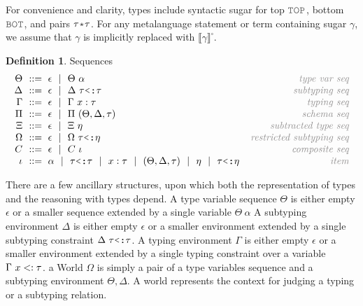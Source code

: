 \documentclass[acmsmall]{acmart}
\theoremstyle{definition}
\newtheorem{definition}{Definition}[section]
\begin{document}
\noindent
For convenience and clarity, types include syntactic sugar for top $\J{TOP}$, 
bottom $\J{BOT}$, and pairs $\tau \J{*} \tau$.
For any metalanguage statement or term containing sugar $\gamma$, we assume that $\gamma$ is implicitly replaced with $\llbracket \gamma \rrbracket^\square$.


\begin{definition} Sequences 
  \label{def:sequences}
  \[\begin{array}[t]{r@{}l@{}r}
    \nonterm{\Theta} & \is \epsilon \sep \Theta\ \alpha 
    & \com{type var seq}
    \\
    \nonterm{\Delta} & \is \epsilon \sep \Delta \  \tau \J{<:} \tau
    & \com{subtyping seq}
    \\
    \nonterm{\Gamma} & \is \epsilon \sep \Gamma\ x \hastype \tau
    & \com{typing seq}
    \\
    \nonterm{\Pi} & \is \epsilon \sep \Pi\ (\Theta, \Delta, \tau) 
    & \com{schema seq}
    \\
    \nonterm{\Xi} & \is \epsilon \sep \Xi\ \eta 
    & \com{subtracted type seq}
    \\
    \nonterm{\Omega} & \is \epsilon \sep \Omega \  \tau \J{<:} \eta
    & \com{restricted subtyping seq}
    \\
    \nonterm{C} & \is \epsilon \sep C\ \iota 
    & \com{composite seq}
    \\
    \nonterm{\iota} & \is 
    \alpha
    \sep 
    \tau \J{<:} \tau
    \sep
    x \hastype \tau
    \sep
    (\Theta, \Delta, \tau)
    \sep
    \eta
    \sep
    \tau \J{<:} \eta

    & \com{item}
  \end{array}\]
\end{definition}




There are a few ancillary structures, upon which both the representation of types and the reasoning with types depend.
A type variable sequence $\Theta$ is either empty $\epsilon$ or a smaller sequence extended by a single variable $\Theta\ \alpha$
A subtyping environment $\Delta$ is either empty $\epsilon$ or a smaller environment extended by a single
subtyping constraint $\Delta \  \tau \J{<:} \tau$.
A typing environment $\Gamma$ is either empty $\epsilon$ or a smaller environment extended by a single
typing constraint over a variable $\Gamma\ x <: \tau$.
a World $\Omega$ is simply a pair of a type variables sequence and a subtyping environment $\Theta, \Delta$.
A world represents the context for judging a typing or a subtyping relation.
\end{document}
